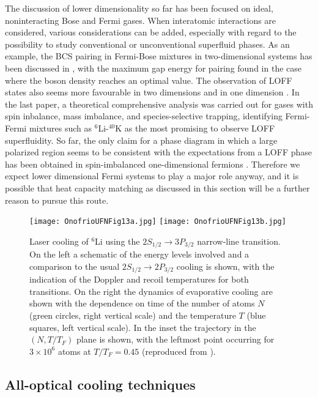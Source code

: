 \documentclass[pra,letterpaper,twocolumn,showpacs,superscriptaddress]{revtex4}
\begin{document}
The discussion of lower dimensionality so far has been focused on ideal, noninteracting Bose and Fermi gases. When interatomic interactions 
are considered, various considerations can be added, especially with regard to the possibility to study conventional or unconventional superfluid phases.
As an example, the BCS pairing in Fermi-Bose mixtures in two-dimensional systems has been discussed in \cite{Mur2004}, with the maximum 
gap energy for pairing found in the case where the boson density reaches an optimal value. The observation of LOFF states also seems more favourable in two dimensions 
\cite{Samokhvalov2010} and in one dimension \cite{Dalmonte2012}. In the last paper, a theoretical comprehensive analysis was carried out for gases with spin 
inbalance, mass imbalance, and species-selective trapping, identifying Fermi-Fermi mixtures such as ${}^6$Li-${}^{40}$K as the most promising to 
observe LOFF superfluidity. So far, the only claim for a phase diagram in which a large polarized region seems to be consistent with the expectations 
from a LOFF phase has been obtained in spin-imbalanced one-dimensional fermions \cite{Liao2010}. Therefore we expect lower dimensional Fermi systems 
to play a major role anyway, and it is possible that heat capacity matching as discussed in this section will be a further reason to pursue this route. 

\begin{figure*}[t]
\begin{center}
\texttt{[image: OnofrioUFNFig13a.jpg]}
\texttt{[image: OnofrioUFNFig13b.jpg]}
\end{center}
\caption{Laser cooling of ${}^6$Li using the $2S_{1/2}\rightarrow 3P_{3/2}$ narrow-line transition. On the left a schematic of the 
energy levels involved and a comparison to the usual $2S_{1/2}\rightarrow 2P_{3/2}$ cooling is shown, with the indication of 
the Doppler and recoil temperatures for both transitions. On the right the dynamics of evaporative cooling are shown with the 
dependence on time of the number of atoms $N$ (green circles, right vertical scale) and the temperature $T$ (blue squares, left vertical scale). 
In the inset the trajectory in the $(N,T/T_F)$ plane is shown, with the leftmost point occurring for $3 \times 10^6$ atoms at $T/T_F=0.45$ 
 (reproduced from \cite{Duarte2011}).}
\end{figure*}

\subsection{All-optical cooling techniques}
\end{document}
